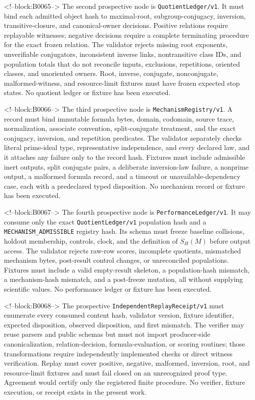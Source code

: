 \documentclass[11pt,a4paper]{article}
\begin{document}
<!--block:B0065-->
The second prospective node is \texttt{QuotientLedger/v1}. It must bind each admitted object hash to maximal-root, subgroup-conjugacy, inversion, transitive-closure, and canonical-owner decisions. Positive relations require replayable witnesses; negative decisions require a complete terminating procedure for the exact frozen relation. The validator rejects missing root exponents, unverifiable conjugators, inconsistent inverse links, nontransitive class IDs, and population totals that do not reconcile inputs, exclusions, repetitions, oriented classes, and unoriented owners. Root, inverse, conjugate, nonconjugate, malformed-witness, and resource-limit fixtures must have frozen expected stop states. No quotient ledger or fixture has been executed.

<!--block:B0066-->
The third prospective node is \texttt{MechanismRegistry/v1}. A record must bind immutable formula bytes, domain, codomain, source trace, normalization, associate convention, split-conjugate treatment, and the exact conjugacy, inversion, and repetition predicates. The validator separately checks literal prime-ideal type, representative independence, and every declared law, and it attaches any failure only to the record hash. Fixtures must include admissible inert outputs, split conjugate pairs, a deliberate inversion-law failure, a nonprime output, a malformed formula record, and a timeout or unavailable-dependency case, each with a predeclared typed disposition. No mechanism record or fixture has been executed.

<!--block:B0067-->
The fourth prospective node is \texttt{PerformanceLedger/v1}. It may consume only the exact \texttt{QuotientLedger/v1} population hash and a \texttt{MECHANISM\_ADMISSIBLE} registry hash. Its schema must freeze baseline collisions, holdout membership, controls, clock, and the definition of \(S_H(M)\) before output access. The validator rejects raw-row scores, incomplete quotients, mismatched mechanism bytes, post-result control changes, or unreconciled populations. Fixtures must include a valid empty-result skeleton, a population-hash mismatch, a mechanism-hash mismatch, and a post-freeze mutation, all without supplying scientific values. No performance ledger or fixture has been executed.

<!--block:B0068-->
The prospective \texttt{IndependentReplayReceipt/v1} must enumerate every consumed content hash, validator version, fixture identifier, expected disposition, observed disposition, and first mismatch. The verifier may reuse parsers and public schemas but must not import producer-side canonicalization, relation-decision, formula-evaluation, or scoring routines; those transformations require independently implemented checks or direct witness verification. Replay must cover positive, negative, malformed, inversion, root, and resource-limit fixtures and must fail closed on an unrecognized proof type. Agreement would certify only the registered finite procedure. No verifier, fixture execution, or receipt exists in the present work.
\end{document}
